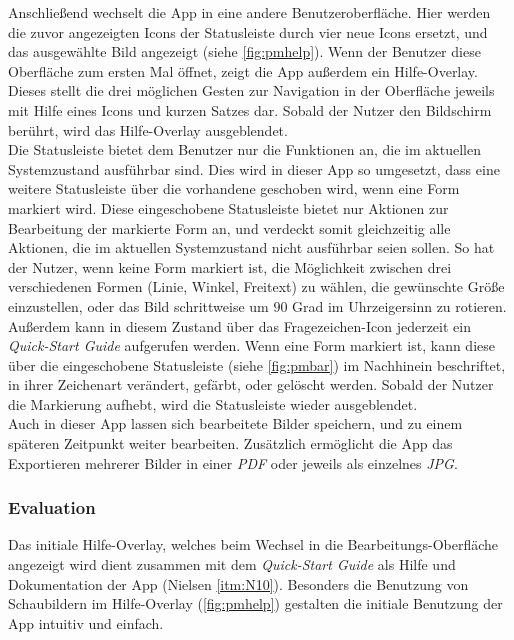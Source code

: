 Anschließend wechselt die App in eine andere Benutzeroberfläche.
Hier werden die zuvor angezeigten Icons der Statusleiste durch vier neue Icons ersetzt, und das ausgewählte Bild angezeigt (siehe \autoref{fig:pmhelp}).
Wenn der Benutzer diese Oberfläche zum ersten Mal öffnet, zeigt die App außerdem ein Hilfe-Overlay.
Dieses stellt die drei möglichen Gesten zur Navigation in der Oberfläche jeweils mit Hilfe eines Icons und kurzen Satzes dar. 
Sobald der Nutzer den Bildschirm berührt, wird das Hilfe-Overlay ausgeblendet. \\

Die Statusleiste bietet dem Benutzer nur die Funktionen an, die im aktuellen Systemzustand ausführbar sind.
Dies wird in dieser App so umgesetzt, dass eine weitere Statusleiste über die vorhandene geschoben wird, wenn eine Form markiert wird.
Diese eingeschobene Statusleiste bietet nur Aktionen zur Bearbeitung der markierte Form an, und verdeckt somit gleichzeitig alle Aktionen, die im aktuellen Systemzustand nicht ausführbar seien sollen.
So hat der Nutzer, wenn keine Form markiert ist, die Möglichkeit zwischen drei verschiedenen Formen (Linie, Winkel, Freitext) zu wählen, die gewünschte Größe einzustellen, oder das Bild schrittweise um $90$ Grad im Uhrzeigersinn zu rotieren.
Außerdem kann in diesem Zustand über das Fragezeichen-Icon jederzeit ein \emph{Quick-Start Guide} aufgerufen werden.
Wenn eine Form markiert ist, kann diese über die eingeschobene Statusleiste (siehe \autoref{fig:pmbar}) im Nachhinein beschriftet, in ihrer Zeichenart verändert, gefärbt, oder gelöscht werden.
Sobald der Nutzer die Markierung aufhebt, wird die Statusleiste wieder ausgeblendet. \\

Auch in dieser App lassen sich bearbeitete Bilder speichern, und zu einem späteren Zeitpunkt weiter bearbeiten.
Zusätzlich ermöglicht die App das Exportieren mehrerer Bilder in einer \emph{PDF} oder jeweils als einzelnes \emph{JPG}.

\subsubsection{Evaluation}\label{subsec:pmeva}
Das initiale Hilfe-Overlay, welches beim Wechsel in die Bearbeitungs-Oberfläche angezeigt wird dient zusammen mit dem \emph{Quick-Start Guide} als Hilfe und Dokumentation der App (Nielsen \autoref{itm:N10}).
Besonders die Benutzung von Schaubildern im Hilfe-Overlay (\autoref{fig:pmhelp}) gestalten die initiale Benutzung der App intuitiv und einfach. \\

